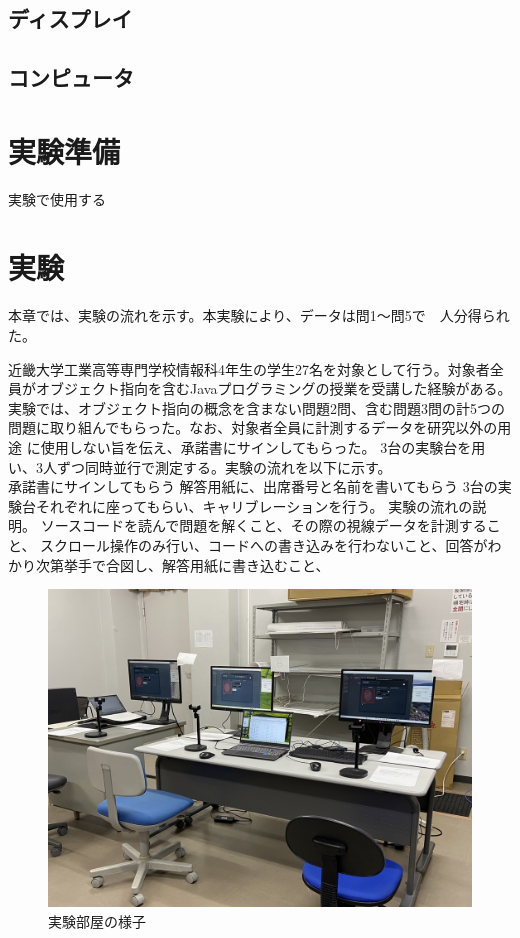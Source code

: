 \documentclass[paper=a4paper,fontsize=10pt]{jlreq}
\begin{document}
    \subsection{ディスプレイ}


    \subsection{コンピュータ}
      
  
  \section{実験準備}
    実験で使用する

  \section{実験}
    本章では、実験の流れを示す。本実験により、データは問1～問5で　人分得られた。

    近畿大学工業高等専門学校情報科4年生の学生27名を対象として行う。対象者全員がオブジェクト指向を含むJavaプログラミングの授業を受講した経験がある。\\
    実験では、オブジェクト指向の概念を含まない問題2問、含む問題3問の計5つの問題に取り組んでもらった。なお、対象者全員に計測するデータを研究以外の用途
    に使用しない旨を伝え、承諾書にサインしてもらった。
    3台の実験台を用い、3人ずつ同時並行で測定する。実験の流れを以下に示す。\\
    
    承諾書にサインしてもらう
    解答用紙に、出席番号と名前を書いてもらう
    3台の実験台それぞれに座ってもらい、キャリブレーションを行う。
    実験の流れの説明。
    ソースコードを読んで問題を解くこと、その際の視線データを計測すること、
    スクロール操作のみ行い、コードへの書き込みを行わないこと、回答がわかり次第挙手で合図し、解答用紙に書き込むこと、


    \begin{figure}[htbp]
      \centering
      \includegraphics[width=0.8\linewidth]{実験部屋.jpg}
      \caption{実験部屋の様子}
    \end{figure}
\end{document}
